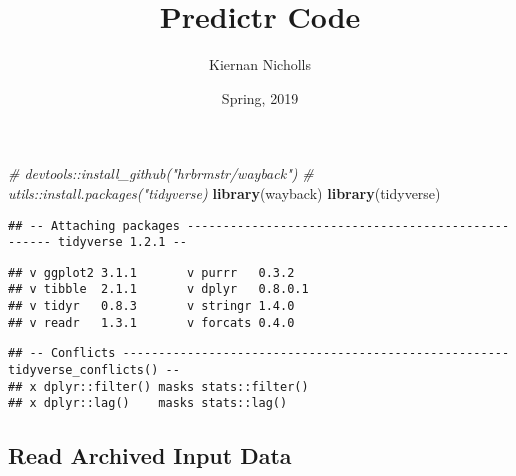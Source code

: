 \documentclass[]{article}
\title{Predictr Code}
\author{Kiernan Nicholls}
\date{Spring, 2019}
\newenvironment{Shaded}{\begin{snugshade}}{\end{snugshade}}
\newcommand{\CommentTok}[1]{\textcolor[rgb]{0.56,0.35,0.01}{\textit{#1}}}
\newcommand{\KeywordTok}[1]{\textcolor[rgb]{0.13,0.29,0.53}{\textbf{#1}}}
\newcommand{\NormalTok}[1]{#1}
\begin{document}
\maketitle

\begin{Shaded}
\begin{Highlighting}[]
\CommentTok{# devtools::install_github("hrbrmstr/wayback")}
\CommentTok{# utils::install.packages("tidyverse)}
\KeywordTok{library}\NormalTok{(wayback)}
\KeywordTok{library}\NormalTok{(tidyverse)}
\end{Highlighting}
\end{Shaded}

\begin{verbatim}
## -- Attaching packages --------------------------------------------------- tidyverse 1.2.1 --
\end{verbatim}

\begin{verbatim}
## v ggplot2 3.1.1       v purrr   0.3.2  
## v tibble  2.1.1       v dplyr   0.8.0.1
## v tidyr   0.8.3       v stringr 1.4.0  
## v readr   1.3.1       v forcats 0.4.0
\end{verbatim}

\begin{verbatim}
## -- Conflicts ------------------------------------------------------ tidyverse_conflicts() --
## x dplyr::filter() masks stats::filter()
## x dplyr::lag()    masks stats::lag()
\end{verbatim}

\hypertarget{read-archived-input-data}{%
\subsection{Read Archived Input Data}\label{read-archived-input-data}}
\end{document}
